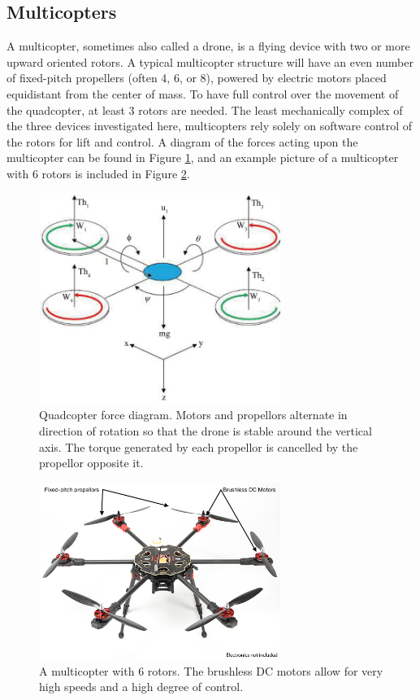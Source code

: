 \subsection{Multicopters}
A multicopter, sometimes also called a drone, is a flying device with two or more upward oriented rotors. A typical multicopter structure will have an even number of fixed-pitch propellers (often 4, 6, or 8), powered by electric motors placed equidistant from the center of mass\cite{multicopter_background}. To have full control over the movement of the quadcopter, at least 3 rotors are needed\cite{multicopter_dynamics_2}. The least mechanically complex of the three devices investigated here, multicopters rely solely on software control of the rotors for lift and control. A diagram of the forces acting upon the multicopter can be found in Figure \ref{fig:quad_diagram}, and an example picture of a multicopter with 6 rotors is included in Figure \ref{fig:multicopter_hex}.\par
\begin{figure}[ht]
\centering
\includegraphics[width=0.70\textwidth]{img/quad_force_diagram.jpg}
\caption{Quadcopter force diagram. Motors and propellors alternate in direction of rotation so that the drone is stable around the vertical axis. The torque generated by each propellor is cancelled by the propellor opposite it\cite{multicopter_dynamics_3}.}
\label{fig:quad_diagram}
\end{figure}\par
\begin{figure}[ht]
\centering
\includegraphics[width=0.70\textwidth]{img/hexacopter.jpg}
\caption{A multicopter with 6 rotors. The brushless DC motors allow for very high speeds and a high degree of control.}
\label{fig:multicopter_hex}
\end{figure}\par
